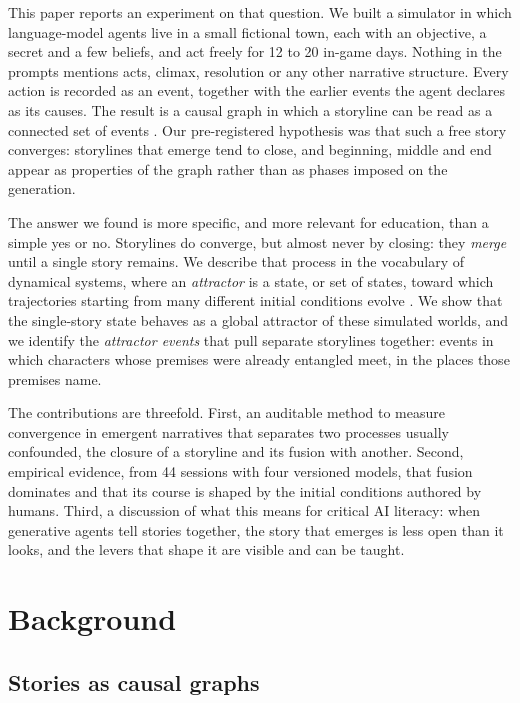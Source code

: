 \documentclass[12pt]{article}
\begin{document}
This paper reports an experiment on that question. We built a simulator in
which language-model agents live in a small fictional town, each with an
objective, a secret and a few beliefs, and act freely for 12 to 20 in-game
days. Nothing in the prompts mentions acts, climax, resolution or any other
narrative structure. Every action is recorded as an event, together with the
earlier events the agent declares as its causes. The result is a causal graph
in which a storyline can be read as a connected set of events
\parencite{trabasso1985}. Our pre-registered hypothesis was that such a free
story converges: storylines that emerge tend to close, and beginning, middle
and end appear as properties of the graph rather than as phases imposed on
the generation.

The answer we found is more specific, and more relevant for education, than
a simple yes or no. Storylines do converge, but almost never by closing:
they \emph{merge} until a single story remains. We describe that process in
the vocabulary of dynamical systems, where an \emph{attractor} is a state, or
set of states, toward which trajectories starting from many different
initial conditions evolve \parencite{strogatz2015,lorenz1963}. We show that
the single-story state behaves as a global attractor of these simulated
worlds, and we identify the \emph{attractor events} that pull separate
storylines together: events in which characters whose premises were already
entangled meet, in the places those premises name.

The contributions are threefold. First, an auditable method to measure
convergence in emergent narratives that separates two processes usually
confounded, the closure of a storyline and its fusion with another. Second,
empirical evidence, from 44 sessions with four versioned models, that fusion
dominates and that its course is shaped by the initial conditions authored
by humans. Third, a discussion of what this means for critical AI literacy:
when generative agents tell stories together, the story that emerges is
less open than it looks, and the levers that shape it are visible and can be
taught.

\section{Background}

\subsection{Stories as causal graphs}
\end{document}
